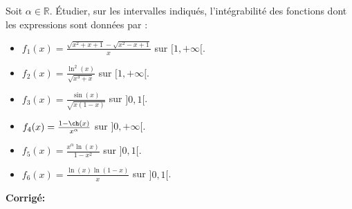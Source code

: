 \documentclass[a4paper,twoside,french,10pt]{VcCours}
\newcommand{\corr}{\textbf{Corrigé:}}
\begin{document}
\medskip

\begin{Exercice}{} Soit $\alpha \in \mathbb{R}$. Étudier, sur les intervalles indiqués, l'intégrabilité des fonctions dont les expressions sont données par :
\begin{multicols}{2}
\begin{itemize}
\item $f_1(x)=\frac{\sqrt{x^2+x+1}-\sqrt{x^2-x+1}}{x}$ sur \newline $[1,+\infty[$.
\item $f_2(x)=\frac{\ln^2(x)}{\sqrt{x^3+x}}$ sur $[1,+\infty[$.
\item $f_3(x)=\frac{\sin(x)}{\sqrt{x(1-x)}}$ sur $]0,1[$.
\columnbreak
\item $f_4(x)=\frac{1-\ch(x)}{x^{\alpha}}$ sur $]0,+\infty[$.
\item $f_5(x)=\frac{x^{\alpha}\ln(x)}{1-x^2}$ sur $]0,1[$.
\item $f_6(x)=\frac{\ln(x)\ln(1-x)}{x}$ sur $]0,1[$.
\end{itemize}
\end{multicols}

\vspace{0.1cm}
\end{Exercice}

\corr 
\end{document}
